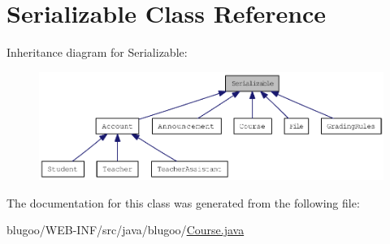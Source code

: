 \hypertarget{classSerializable}{
\section{Serializable Class Reference}
\label{classSerializable}
}
Inheritance diagram for Serializable:\nopagebreak
\begin{figure}[H]
\begin{center}
\leavevmode
\includegraphics[width=400pt]{classSerializable__inherit__graph}
\end{center}
\end{figure}


The documentation for this class was generated from the following file:\begin{CompactItemize}
\item 
blugoo/WEB-INF/src/java/blugoo/\hyperlink{Course_8java}{Course.java}\end{CompactItemize}
